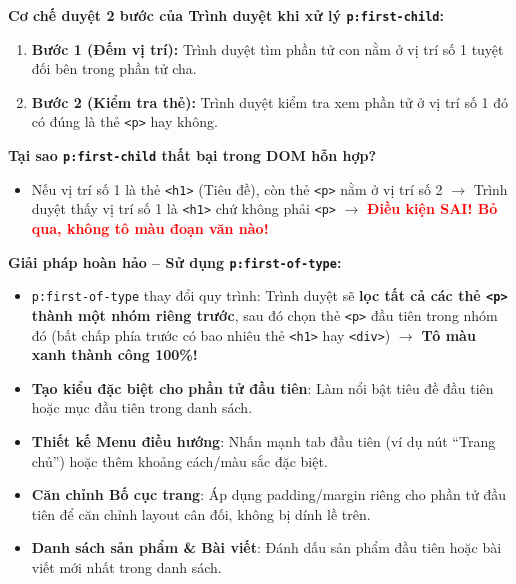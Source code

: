 \documentclass[11pt,oneside]{book}
\newcommand{\codeinline}[1]{\textcolor{accentOrange}{\texttt{#1}}}
\begin{document}
\begin{warnBox}
\textbf{Cơ chế duyệt 2 bước của Trình duyệt khi xử lý \codeinline{p:first-child}:}
\begin{enumerate}[leftmargin=1.5em, itemsep=2pt, parsep=0pt]
    \item \textbf{Bước 1 (Đếm vị trí):} Trình duyệt tìm phần tử con nằm ở vị trí số 1 tuyệt đối bên trong phần tử cha.
    \item \textbf{Bước 2 (Kiểm tra thẻ):} Trình duyệt kiểm tra xem phần tử ở vị trí số 1 đó có đúng là thẻ \codeinline{<p>} hay không.
\end{enumerate}

\par\vspace{4pt}
\textbf{Tại sao \codeinline{p:first-child} thất bại trong DOM hỗn hợp?}
\begin{itemize}[leftmargin=1.5em, itemsep=3pt, parsep=0pt]
    \item Nếu vị trí số 1 là thẻ \codeinline{<h1>} (Tiêu đề), còn thẻ \codeinline{<p>} nằm ở vị trí số 2 $\rightarrow$ Trình duyệt thấy vị trí số 1 là \codeinline{<h1>} chứ không phải \codeinline{<p>} $\rightarrow$ \textcolor{red}{\textbf{Điều kiện SAI! Bỏ qua, không tô màu đoạn văn nào!}}
\end{itemize}

\par\vspace{4pt}
\textbf{Giải pháp hoàn hảo -- Sử dụng \codeinline{p:first-of-type}:}
\begin{itemize}[leftmargin=1.5em, itemsep=3pt, parsep=0pt]
    \item \codeinline{p:first-of-type} thay đổi quy trình: Trình duyệt sẽ \textbf{lọc tất cả các thẻ \codeinline{<p>} thành một nhóm riêng trước}, sau đó chọn thẻ \codeinline{<p>} đầu tiên trong nhóm đó (bất chấp phía trước có bao nhiêu thẻ \codeinline{<h1>} hay \codeinline{<div>}) $\rightarrow$ \textcolor{green!70!black}{\textbf{Tô màu xanh thành công 100\%!}}
\end{itemize}
\end{warnBox}

\begin{conceptBox}
\begin{itemize}[leftmargin=1.5em, itemsep=3pt, parsep=0pt]
    \item \textbf{Tạo kiểu đặc biệt cho phần tử đầu tiên}: Làm nổi bật tiêu đề đầu tiên hoặc mục đầu tiên trong danh sách.
    \item \textbf{Thiết kế Menu điều hướng}: Nhấn mạnh tab đầu tiên (ví dụ nút ``Trang chủ'') hoặc thêm khoảng cách/màu sắc đặc biệt.
    \item \textbf{Căn chỉnh Bố cục trang}: Áp dụng padding/margin riêng cho phần tử đầu tiên để căn chỉnh layout cân đối, không bị dính lề trên.
    \item \textbf{Danh sách sản phẩm \& Bài viết}: Đánh dấu sản phẩm đầu tiên hoặc bài viết mới nhất trong danh sách.
\end{itemize}
\end{conceptBox}
\end{document}
